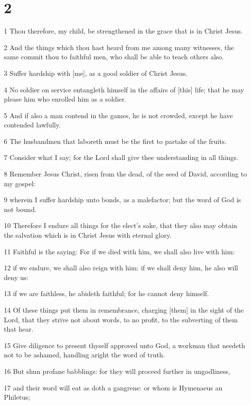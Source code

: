 \chapter{2}

\par 1 Thou therefore, my child, be strengthened in the grace that is in Christ Jesus.
\par 2 And the things which thou hast heard from me among many witnesses, the same commit thou to faithful men, who shall be able to teach others also.
\par 3 Suffer hardship with [me], as a good soldier of Christ Jesus.
\par 4 No soldier on service entangleth himself in the affairs of [this] life; that he may please him who enrolled him as a soldier.
\par 5 And if also a man contend in the games, he is not crowded, except he have contended lawfully.
\par 6 The husbandmen that laboreth must be the first to partake of the fruits.
\par 7 Consider what I say; for the Lord shall give thee understanding in all things.
\par 8 Remember Jesus Christ, risen from the dead, of the seed of David, according to my gospel:
\par 9 wherein I suffer hardship unto bonds, as a malefactor; but the word of God is not bound.
\par 10 Therefore I endure all things for the elect's sake, that they also may obtain the salvation which is in Christ Jesus with eternal glory.
\par 11 Faithful is the saying: For if we died with him, we shall also live with him:
\par 12 if we endure, we shall also reign with him: if we shall deny him, he also will deny us:
\par 13 if we are faithless, he abideth faithful; for he cannot deny himself.
\par 14 Of these things put them in remembrance, charging [them] in the sight of the Lord, that they strive not about words, to no profit, to the subverting of them that hear.
\par 15 Give diligence to present thyself approved unto God, a workman that needeth not to be ashamed, handling aright the word of truth.
\par 16 But shun profane babblings: for they will proceed further in ungodliness,
\par 17 and their word will eat as doth a gangrene: or whom is Hymenaeus an Philetus;
